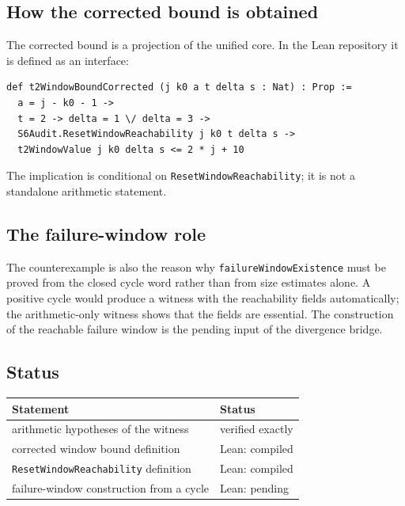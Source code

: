 \subsection{How the corrected bound is obtained}

The corrected bound is a projection of the unified core.  In the Lean
repository it is defined as an interface:
\begin{verbatim}
def t2WindowBoundCorrected (j k0 a t delta s : Nat) : Prop :=
  a = j - k0 - 1 ->
  t = 2 -> delta = 1 \/ delta = 3 ->
  S6Audit.ResetWindowReachability j k0 t delta s ->
  t2WindowValue j k0 delta s <= 2 * j + 10
\end{verbatim}
The implication is conditional on
\texttt{ResetWindowReachability}; it is not a standalone arithmetic
statement.

\subsection{The failure-window role}

The counterexample is also the reason why
\texttt{failureWindowExistence} must be proved from the closed cycle
word rather than from size estimates alone.  A positive cycle would
produce a witness with the reachability fields automatically; the
arithmetic-only witness shows that the fields are essential.  The
construction of the reachable failure window is the pending input of
the divergence bridge.

\subsection{Status}

\begin{center}
\small
\begin{tabular}{@{}ll@{}}
\toprule
Statement & Status \\
\midrule
arithmetic hypotheses of the witness & verified exactly \\
corrected window bound definition & Lean: compiled \\
\texttt{ResetWindowReachability} definition & Lean: compiled \\
failure-window construction from a cycle & Lean: pending \\
\bottomrule
\end{tabular}
\end{center}
